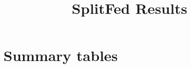 \documentclass{article}
\title{SplitFed Results}
\author{}
\date{}
\begin{document}
\maketitle

\section*{Summary tables}












\end{document}

